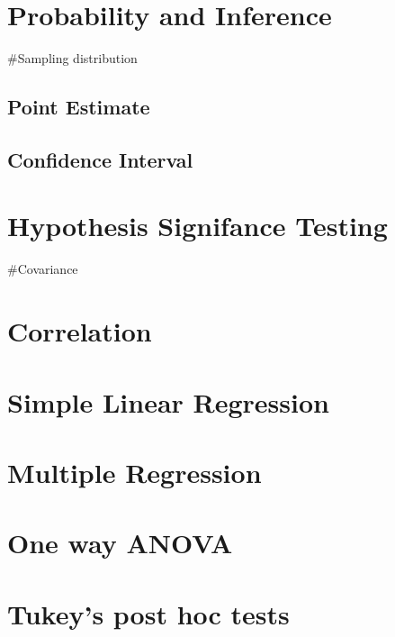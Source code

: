 \documentclass[
]{book}
\begin{document}
\hypertarget{probability-and-inference}{%
\chapter{Probability and Inference}\label{probability-and-inference}}

\#Sampling distribution

\hypertarget{point-estimate}{%
\section{Point Estimate}\label{point-estimate}}

\hypertarget{confidence-interval}{%
\section{Confidence Interval}\label{confidence-interval}}

\hypertarget{hypothesis-signifance-testing}{%
\chapter{Hypothesis Signifance Testing}\label{hypothesis-signifance-testing}}

\#Covariance

\hypertarget{correlation}{%
\chapter{Correlation}\label{correlation}}

\hypertarget{simple-linear-regression}{%
\chapter{Simple Linear Regression}\label{simple-linear-regression}}

\hypertarget{multiple-regression}{%
\chapter{Multiple Regression}\label{multiple-regression}}

\hypertarget{one-way-anova}{%
\chapter{One way ANOVA}\label{one-way-anova}}

\hypertarget{tukeys-post-hoc-tests}{%
\chapter{Tukey's post hoc tests}\label{tukeys-post-hoc-tests}}
\end{document}
